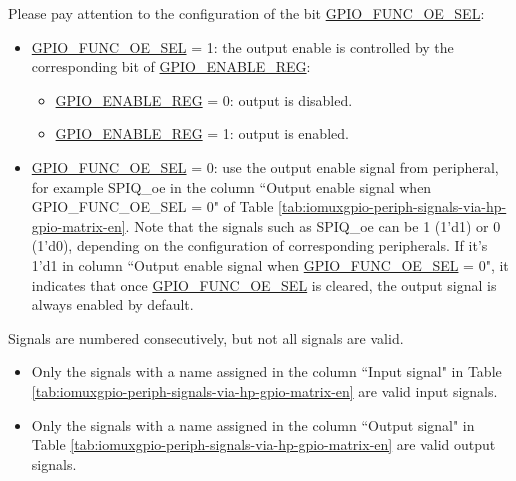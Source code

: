 \documentclass[main\_\_EN.tex]{subfiles}
\begin{document}
Please pay attention to the configuration of the bit \hyperref[fielddesc:GPIOFUNCNOESEL]{GPIO\_FUNC\_OE\_SEL}:

\begin{itemize}
    \item \hyperref[fielddesc:GPIOFUNCNOESEL]{GPIO\_FUNC\_OE\_SEL} = 1: the output enable is controlled by the corresponding bit  of \hyperref[regdesc:GPIOENABLEREG]{GPIO\_ENABLE\_REG}:
    \begin{itemize}
        \item \hyperref[regdesc:GPIOENABLEREG]{GPIO\_ENABLE\_REG} = 0: output is disabled.
        \item \hyperref[regdesc:GPIOENABLEREG]{GPIO\_ENABLE\_REG} = 1: output is enabled.
    \end{itemize}
    \item \hyperref[fielddesc:GPIOFUNCNOESEL]{GPIO\_FUNC\_OE\_SEL} = 0: use the output enable signal from peripheral, for example SPIQ\_oe in the column ``Output enable signal when GPIO\_FUNC\_OE\_SEL = 0" of Table \ref{tab:iomuxgpio-periph-signals-via-hp-gpio-matrix-en}. Note that the signals such as SPIQ\_oe can be 1 (1'd1) or 0 (1'd0), depending on the configuration of corresponding peripherals. If it's 1'd1 in column ``Output enable signal when \hyperref[fielddesc:GPIOFUNCNOESEL]{GPIO\_FUNC\_OE\_SEL} = 0", it indicates that once  \hyperref[fielddesc:GPIOFUNCNOESEL]{GPIO\_FUNC\_OE\_SEL} is cleared, the output signal is always enabled by default.
\end{itemize}

\begin{tiplisting}
Signals are numbered consecutively, but not all signals are valid.
\vspace{-1em}
\begin{itemize}
    \item Only the signals with a name assigned in the column ``Input signal" in Table \ref{tab:iomuxgpio-periph-signals-via-hp-gpio-matrix-en} are valid input signals.
    \item Only the signals with a name assigned in the column ``Output signal" in Table \ref{tab:iomuxgpio-periph-signals-via-hp-gpio-matrix-en} are valid output signals.
\end{itemize}
\end{tiplisting}
\end{document}
